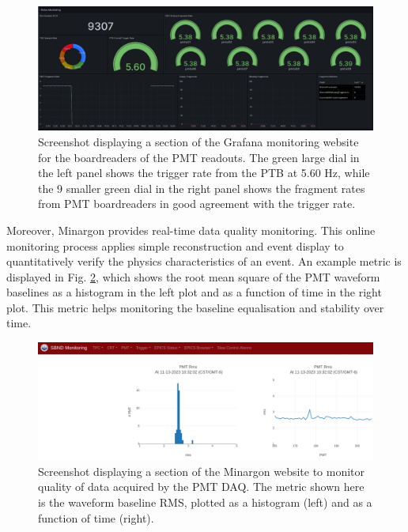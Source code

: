 \begin{figure}[htbp!] 
\centering    
\includegraphics[width=1.0\textwidth]{Grafana}
\caption[Grafana]{
Screenshot displaying a section of the Grafana monitoring website for the boardreaders of the PMT readouts.
The green large dial in the left panel shows the trigger rate from the PTB at 5.60 Hz, while the 9 smaller green dial in the right panel shows the fragment rates from PMT boardreaders in good agreement with the trigger rate.
}
\label{fig:Grafana}
\end{figure}

Moreover, Minargon provides real-time data quality monitoring. 
This online monitoring process applies simple reconstruction and event display to quantitatively verify the physics characteristics of an event. 
An example metric is displayed in Fig. \ref{fig:Minargon}, which shows the root mean square of the PMT waveform baselines as a histogram in the left plot and as a function of time in the right plot.
This metric helps monitoring the baseline equalisation and stability over time.

\begin{figure}[htbp!] 
\centering    
\includegraphics[width=1.0\textwidth]{Minargon}
\caption[Minargon]{
Screenshot displaying a section of the Minargon website to monitor quality of data acquired by the PMT DAQ.
The metric shown here is the waveform baseline RMS, plotted as a histogram (left) and as a function of time (right).
}
\label{fig:Minargon}
\end{figure}

